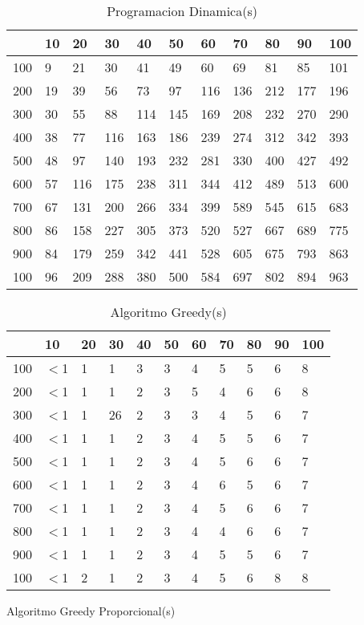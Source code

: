 \documentclass{article}
\begin{document}
\begin{center}
\begin{table}
\centering
\caption{Programacion Dinamica(\textmu s)}
\begin{tabularx}{0.8\textwidth}{|X|X|X|X|X|X|X|X|X|X|X|}
\hline &10&20&30&40&50&60&70&80&90&100\\
\hline 100&9&21&30&41&49&60&69&81&85&101\\
\hline 200&19&39&56&73&97&116&136&212&177&196\\
\hline 300&30&55&88&114&145&169&208&232&270&290\\
\hline 400&38&77&116&163&186&239&274&312&342&393\\
\hline 500&48&97&140&193&232&281&330&400&427&492\\
\hline 600&57&116&175&238&311&344&412&489&513&600\\
\hline 700&67&131&200&266&334&399&589&545&615&683\\
\hline 800&86&158&227&305&373&520&527&667&689&775\\
\hline 900&84&179&259&342&441&528&605&675&793&863\\
\hline 100&96&209&288&380&500&584&697&802&894&963\\
\hline
\end{tabularx}
\end{table}
\begin{table}
\centering
\caption{Algoritmo Greedy(\textmu s)}
\begin{tabularx}{0.8\textwidth}{|X|X|X|X|X|X|X|X|X|X|X|}
\hline &10&20&30&40&50&60&70&80&90&100\\
\hline 100&$<$1&1&1&3&3&4&5&5&6&8\\
\hline 200&$<$1&1&1&2&3&5&4&6&6&8\\
\hline 300&$<$1&1&26&2&3&3&4&5&6&7\\
\hline 400&$<$1&1&1&2&3&4&5&5&6&7\\
\hline 500&$<$1&1&1&2&3&4&5&6&6&7\\
\hline 600&$<$1&1&1&2&3&4&6&5&6&7\\
\hline 700&$<$1&1&1&2&3&4&5&6&6&7\\
\hline 800&$<$1&1&1&2&3&4&4&6&6&7\\
\hline 900&$<$1&1&1&2&3&4&5&5&6&7\\
\hline 100&$<$1&2&1&2&3&4&5&6&8&8\\
\hline
\end{tabularx}
\end{table}
\begin{table}
\centering
\caption{Algoritmo Greedy Proporcional(\textmu s)}

\end{table}
\end{center}
\end{document}
